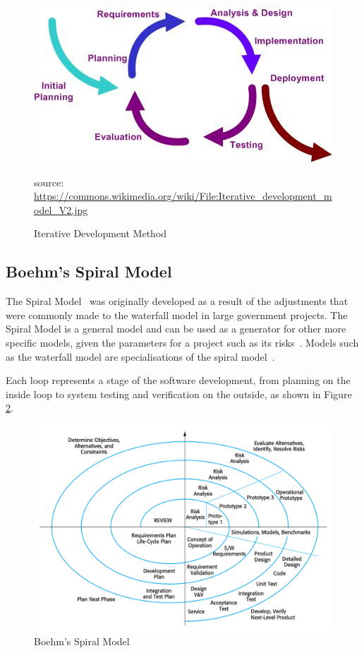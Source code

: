 \documentclass[authoryearcitations]{UoYCSproject}
\begin{document}
\begin{figure}[htb] 
\centering
    \includegraphics[width=0.8\linewidth]{iterativeDevelopment}
\caption{Iterative Development Method}
\small source: \url{https://commons.wikimedia.org/wiki/File:Iterative_development_model_V2.jpg}
\label{fig:iterativeDevelopment}
\end{figure}

\subsection{Boehm's Spiral Model}
The Spiral Model~\cite{spiralModelSoftwareDevelopment} was originally developed as a result of the adjustments that were commonly made to the waterfall model in large government projects.  The Spiral Model is a general model and can be used as a generator for other more specific models, given the parameters for a project such as its risks~\cite{boehm2000spiral}.  Models such as the waterfall model are specialisations of the spiral model~\cite{boehm2000spiral}.

Each loop represents a stage of the software development, from planning on the inside loop to system testing and verification on the outside, as shown in Figure \ref{fig:spiralModel}.

\begin{figure}[htb] 
\centering
    \includegraphics[width=0.8\linewidth]{spiralModel}
\caption{Boehm's Spiral Model~\cite{sommervilleSoftwareEngineering}}
\label{fig:spiralModel}
\end{figure}
\end{document}
